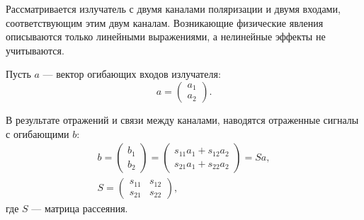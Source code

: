 Рассматривается излучатель с двумя каналами поляризации и двумя входами, соответствующим этим двум каналам. Возникающие физические явления описываются только
линейными выражениями, а нелинейные эффекты не учитываются.

Пусть $a$ --- вектор огибающих входов излучателя:
\[
    a
    = \begin{pmatrix}
          a_1 \\
          a_2
    \end{pmatrix} .
\]

В результате отражений и связи между каналами, наводятся отраженные сигналы с огибающими $b$:
\begin{gather*}
    b
    = \begin{pmatrix}
          b_1 \\
          b_2
    \end{pmatrix}
    = \begin{pmatrix}
          s_{11} a_1 + s_{12} a_2 \\
          s_{21} a_1 + s_{22} a_2
    \end{pmatrix}
    = S a, \\
    S
    = \begin{pmatrix}
          s_{11} & s_{12} \\
          s_{21} & s_{22}
    \end{pmatrix},
\end{gather*}
где $S$ --- матрица рассеяния.

